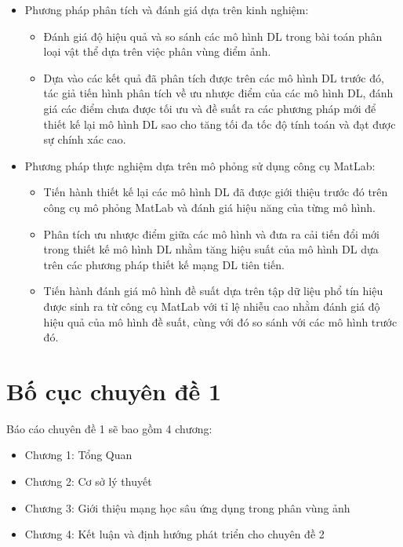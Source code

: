 \begin{itemize}
    \item Phương pháp phân tích và đánh giá dựa trên kinh nghiệm:
    \begin{itemize}
        \item Đánh giá độ hiệu quả và so sánh các mô hình DL trong bài toán phân loại vật thể dựa trên việc phân vùng điểm ảnh.
        \item Dựa vào các kết quả đã phân tích được trên các mô hình DL trước đó, tác giả tiến hình phân tích về ưu nhược điểm của các mô hình DL, đánh giá các điểm chưa được tối ưu và đề suất ra các phương pháp mới để thiết kế lại mô hình DL sao cho tăng tối đa tốc độ tính toán và đạt được sự chính xác cao.
    \end{itemize}
    \item Phương pháp thực nghiệm dựa trên mô phỏng sử dụng công cụ MatLab:
    \begin{itemize}
        \item Tiến hành thiết kế lại các mô hình DL đã được giới thiệu trước đó trên công cụ mô phỏng MatLab và đánh giá hiệu năng của từng mô hình.
        \item Phân tích ưu nhược điểm giữa các mô hình và đưa ra cải tiến đổi mới trong thiết kế mô hình DL nhằm tăng hiệu suất của mô hình DL dựa trên các phương pháp thiết kế mạng DL tiên tiến.
        \item Tiến hành đánh giá mô hình đề suất dựa trên tập dữ liệu phổ tín hiệu được sinh ra từ công cụ MatLab với tỉ lệ nhiễu cao nhằm đánh giá độ hiệu quả của mô hình đề suất, cùng với đó so sánh với các mô hình trước đó.
    \end{itemize}
\end{itemize}

\section{Bố cục chuyên đề 1}

Báo cáo chuyên đề 1 sẽ bao gồm 4 chương:

\begin{itemize}
    \item Chương 1: Tổng Quan
    \item Chương 2: Cơ sở lý thuyết
    \item Chương 3: Giới thiệu mạng học sâu ứng dụng trong phân vùng ảnh
    \item Chương 4: Kết luận và định hướng phát triển cho chuyên đề 2
\end{itemize}


